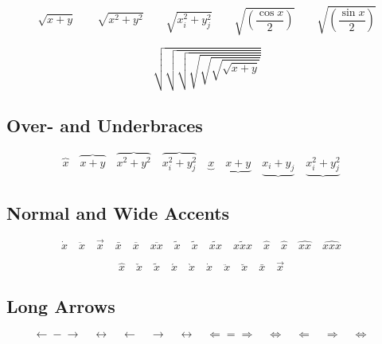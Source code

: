 \begin{displaymath}
  \sqrt{x+y} \qquad \sqrt{x^{2}+y^{2}} \qquad 
  \sqrt{x_{i}^{2}+y_{j}^{2}} \qquad
  \sqrt{\left(\frac{\cos x}{2}\right)} \qquad 
  \sqrt{\left(\frac{\sin x}{2}\right)}
\end{displaymath}
  
\begingroup
\delimitershortfall-1pt
\begin{displaymath}
  \sqrt{\sqrt{\sqrt{\sqrt{\sqrt{\sqrt{\sqrt{x+y}}}}}}}
\end{displaymath}
\endgroup %


\subsection{Over- and Underbraces \showfamily}

\begin{displaymath}
  \overbrace{x} \quad
  \overbrace{x+y} \quad
  \overbrace{x^{2}+y^{2}} \quad
  \overbrace{x_{i}^{2}+y_{j}^{2}} \quad
  \underbrace{x} \quad
  \underbrace{x+y} \quad
  \underbrace{x_{i}+y_{j}} \quad
  \underbrace{x_{i}^{2}+y_{j}^{2}} \quad
\end{displaymath}


\subsection{Normal and Wide Accents \showfamily}

\begin{displaymath}
  \dot{x} \quad 
  \ddot{x} \quad 
  \vec{x} \quad 
  \bar{x} \quad
  \overline{x} \quad
  \overline{xx} \quad
  \tilde{x} \quad
  \widetilde{x} \quad
  \widetilde{xx} \quad
  \widetilde{xxx} \quad
  \hat{x} \quad 
  \widehat{x} \quad 
  \widehat{xx} \quad 
  \widehat{xxx} \quad
\end{displaymath}

\begin{displaymath}
  \hat{x} \quad 
  \check{x} \quad 
  \tilde{x} \quad 
  \acute{x} \quad 
  \grave{x} \quad 
  \dot{x} \quad 
  \ddot{x} \quad 
  \breve{x} \quad 
  \bar{x} \quad 
  \vec{x} \quad 
\end{displaymath}


\subsection{Long Arrows \showfamily}

\begin{displaymath}
  \leftarrow \mathrel{-} \rightarrow \quad
  \leftrightarrow \quad
  \longleftarrow  \quad
  \longrightarrow \quad
  \longleftrightarrow \quad
  \Leftarrow = \Rightarrow \quad
  \Leftrightarrow \quad
  \Longleftarrow  \quad
  \Longrightarrow \quad
  \Longleftrightarrow \quad
\end{displaymath}


